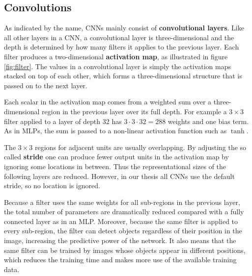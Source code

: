 \subsection{Convolutions}



As indicated by the name, CNNs mainly consist of \textbf{convolutional layers}. Like all other layers in a CNN, a convolutional layer is three-dimensional and the depth is determined by how many filters it applies to the previous layer.  Each filter produces a two-dimensional \textbf{activation map}, as illustrated in figure \ref{fig:filter}. The values in a convolutional layer is simply the activation maps stacked on top of each other, which forms a three-dimensional structure that is passed on to the next layer.

Each scalar in the activation map comes from a weighted sum over a three-dimensional region in the previous layer over its full depth. For example a $3 \times 3$ filter applied to a layer of depth 32 has $3 \cdot 3 \cdot 32=288$ weights and one bias term.
As in MLPs, the sum is passed to a non-linear activation function such as $\tanh$.

The $3 \times 3$ regions for adjacent units are usually overlapping.
By adjusting the so called \textbf{stride} one can produce fewer output units in the activation map by ignoring some locations in between.
Thus the representational sizes of the following layers are reduced.
However, in our thesis all CNNs use the default stride, so no location is ignored.


Because a filter uses the same weights for all sub-regions in the previous layer, the total number of parameters are dramatically reduced compared with a fully connected layer as in an MLP. Moreover, because the same filter is applied to every sub-region, the filter can detect objects regardless of their position in the image, increasing the predictive power of the network.
It also means that the same filter can be trained by images whose objects appear in different positions, which reduces the training time and makes more use of the available training data.

